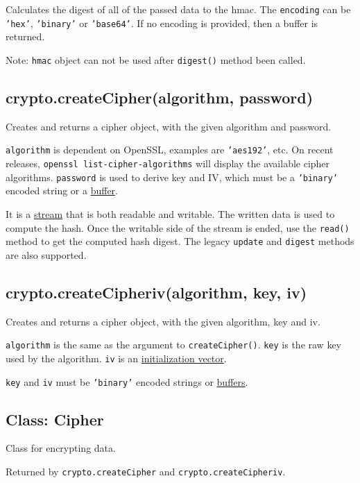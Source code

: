 Calculates the digest of all of the passed data to the hmac. The
\texttt{encoding} can be \texttt{'hex'}, \texttt{'binary'} or
\texttt{'base64'}. If no encoding is provided, then a buffer is
returned.

Note: \texttt{hmac} object can not be used after \texttt{digest()}
method been called.

\subsection{crypto.createCipher(algorithm, password)}

Creates and returns a cipher object, with the given algorithm and
password.

\texttt{algorithm} is dependent on OpenSSL, examples are
\texttt{'aes192'}, etc. On recent releases,
\texttt{openssl list-cipher-algorithms} will display the available
cipher algorithms. \texttt{password} is used to derive key and IV, which
must be a \texttt{'binary'} encoded string or a
\href{buffer.html}{buffer}.

It is a \href{stream.html}{stream} that is both readable and writable.
The written data is used to compute the hash. Once the writable side of
the stream is ended, use the \texttt{read()} method to get the computed
hash digest. The legacy \texttt{update} and \texttt{digest} methods are
also supported.

\subsection{crypto.createCipheriv(algorithm, key, iv)}

Creates and returns a cipher object, with the given algorithm, key and
iv.

\texttt{algorithm} is the same as the argument to
\texttt{createCipher()}. \texttt{key} is the raw key used by the
algorithm. \texttt{iv} is an
\href{http://en.wikipedia.org/wiki/Initialization\_vector}{initialization
vector}.

\texttt{key} and \texttt{iv} must be \texttt{'binary'} encoded strings
or \href{buffer.html}{buffers}.

\subsection{Class: Cipher}

Class for encrypting data.

Returned by \texttt{crypto.createCipher} and
\texttt{crypto.createCipheriv}.

